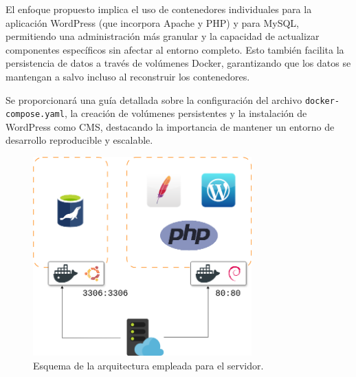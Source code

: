 \documentclass[a4paper]{article}
\begin{document}
\vspace{1em}

El enfoque propuesto implica el uso de contenedores individuales para la aplicación WordPress (que incorpora Apache y PHP) y para MySQL, permitiendo una administración más granular y la capacidad de actualizar componentes específicos sin afectar al entorno completo. Esto también facilita la persistencia de datos a través de volúmenes Docker, garantizando que los datos se mantengan a salvo incluso al reconstruir los contenedores.

\vspace{1em}

Se proporcionará una guía detallada sobre la configuración del archivo \texttt{docker-compose.yaml}, la creación de volúmenes persistentes y la instalación de WordPress como CMS, destacando la importancia de mantener un entorno de desarrollo reproducible y escalable.

\vspace{2em}

\begin{figure}[!h]
    \centering
    \includegraphics[width=0.75\textwidth]{images/lamp_docker_diagram.png}
    \captionsetup{width=0.7\textwidth}
    \caption{Esquema de la arquitectura empleada para el servidor.}
    \label{fig:lamp_stack}
\end{figure}

\newpage

\end{document}
